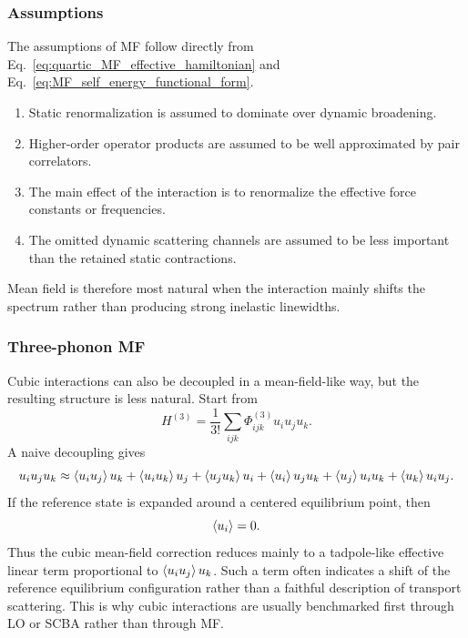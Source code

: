 \subsubsection{Assumptions}
The assumptions of MF follow directly from Eq.~\eqref{eq:quartic_MF_effective_hamiltonian} and Eq.~\eqref{eq:MF_self_energy_functional_form}.
\begin{enumerate}[label=\arabic*.]
\item Static renormalization is assumed to dominate over dynamic broadening.
\item Higher-order operator products are assumed to be well approximated by pair correlators.
\item The main effect of the interaction is to renormalize the effective force constants or frequencies.
\item The omitted dynamic scattering channels are assumed to be less important than the retained static contractions.
\end{enumerate}
Mean field is therefore most natural when the interaction mainly shifts the spectrum rather than producing strong inelastic linewidths.

\subsubsection{Three-phonon MF}
Cubic interactions can also be decoupled in a mean-field-like way, but the resulting structure is less natural. Start from
\begin{equation}
    H^{(3)} = \frac{1}{3!}\sum_{ijk}\Phi^{(3)}_{ijk}u_i u_j u_k.
    \label{eq:cubic_start_for_MF}
\end{equation}
A naive decoupling gives
\begin{equation}
    u_i u_j u_k
    \approx
    \left\langle u_i u_j \right\rangle u_k + \left\langle u_i u_k \right\rangle u_j + \left\langle u_j u_k \right\rangle u_i
    + \left\langle u_i \right\rangle u_j u_k + \left\langle u_j \right\rangle u_i u_k + \left\langle u_k \right\rangle u_i u_j.
    \label{eq:cubic_MF_decoupling_explicit}
\end{equation}
If the reference state is expanded around a centered equilibrium point, then
\begin{equation}
    \left\langle u_i \right\rangle=0.
\end{equation}
Thus the cubic mean-field correction reduces mainly to a tadpole-like effective linear term proportional to $\left\langle u_i u_j \right\rangle u_k$. Such a term often indicates a shift of the reference equilibrium configuration rather than a faithful description of transport scattering. This is why cubic interactions are usually benchmarked first through LO or SCBA rather than through MF.

